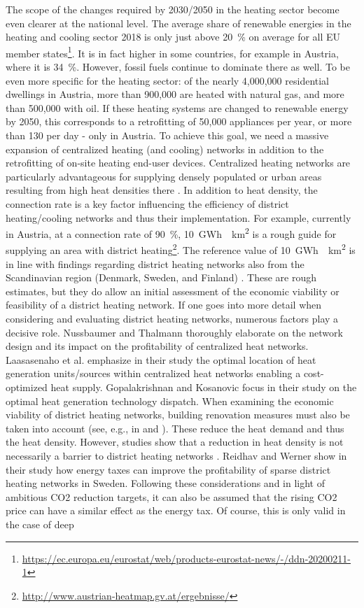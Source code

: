 The scope of the changes required by 2030/2050 in the heating sector become even clearer at the national level. The average share of renewable energies in the heating and cooling sector 2018 is only just above \SI{20}{\%} on average for all EU member states\footnote{\url{https://ec.europa.eu/eurostat/web/products-eurostat-news/-/ddn-20200211-1}}. It is in fact higher in some countries, for example in Austria, where it is \SI{34}{\%}. However, fossil fuels continue to dominate there as well. To be even more specific for the heating sector: of the nearly 4,000,000 residential dwellings in Austria, more than 900,000 are heated with natural gas, and more than 500,000 with oil. If these heating systems are changed to renewable energy by 2050, this corresponds to a retrofitting of 50,000 appliances per year, or more than 130 per day - only in Austria. To achieve this goal, we need a massive expansion of centralized heating (and cooling) networks in addition to the retrofitting of on-site heating end-user devices. Centralized heating networks are particularly advantageous for supplying densely populated or urban areas resulting from high heat densities there \cite{inage2020development}. In addition to heat density, the connection rate is a key factor influencing the efficiency of district heating/cooling networks and thus their implementation. For example, currently in Austria, at a connection rate of \SI{90}{\%}, \SI{10}{GWh \per km^2} is a rough guide for supplying an area with district heating\footnote{\url{http://www.austrian-heatmap.gv.at/ergebnisse/}}. The reference value of \SI{10}{GWh \per km^2} is in line with findings regarding district heating networks also from the Scandinavian region (Denmark, Sweden, and Finland) \cite{zinko2008district}. These are rough estimates, but they do allow an initial assessment of the economic viability or feasibility of a district heating network. If one goes into more detail when considering and evaluating district heating networks, numerous factors play a decisive role. Nussbaumer and Thalmann \cite{nussbaumer2016influence} thoroughly elaborate on the network design and its impact on the profitability of centralized heat networks. Laasasenaho et al. \cite{laasasenaho2019gis} emphasize in their study the optimal location of heat generation units/sources within centralized heat networks enabling a cost-optimized heat supply. Gopalakrishnan and Kosanovic \cite{gopalakrishnan2014economic} focus in their study on the optimal heat generation technology dispatch. When examining the economic viability of district heating networks, building renovation measures must also be taken into account (see, e.g., in \cite{andric2018impact} and \cite{rabani2021achieving}). These reduce the heat demand and thus the heat density. However, studies show that a reduction in heat density is not necessarily a barrier to district heating networks \cite{persson2011heat}. Reidhav and Werner \cite{reidhav2008profitability} show in their study how energy taxes can improve the profitability of sparse district heating networks in Sweden. Following these considerations and in light of ambitious CO2 reduction targets, it can also be assumed that the rising CO2 price can have a similar effect as the energy tax. Of course, this is only valid in the case of deep 